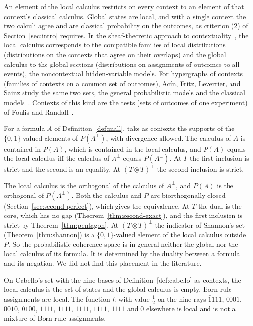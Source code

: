 \noindent
An element of the local calculus restricts on every context to an element
of that context's classical calculus. Global states are local, and with a
single context the two calculi agree and are classical probability on the
outcomes, as criterion (2) of Section~\ref{sec:intro}
requires. In the sheaf-theoretic approach to
contextuality~\cite{abramsky-brandenburger2011}, the local calculus
corresponds to the compatible families of local distributions
(distributions on the contexts that agree on their overlaps) and the
global calculus to the global sections (distributions on assignments of
outcomes to all events), the noncontextual hidden-variable models. For
hypergraphs of contexts (families of contexts on a common set of
outcomes), Ac\'in, Fritz, Leverrier, and Sainz
study the same two sets, the general probabilistic models and the
classical models~\cite{acin2015}. Contexts of this kind are
the tests (sets of outcomes of one experiment) of Foulis and
Randall~\cite{foulis-randall1972}.

\begin{theorem}
\label{thm:loc-linear}
For a formula $A$ of Definition~\ref{def:mall}, take as contexts the
supports of the $\{0,1\}$-valued elements of $P(A^{\perp})$, with
divergence allowed. The calculus of $A$ is contained in $P(A)$, which is
contained in the local calculus, and $P(A)$ equals the local calculus iff
the calculus of $A^{\perp}$ equals $P(A^{\perp})$. At $T$ the first
inclusion is strict and the second is an equality. At $(T \otimes
T)^{\perp}$ the second inclusion is strict.
\end{theorem}

\noindent
The local calculus is the orthogonal of the calculus of $A^{\perp}$, and
$P(A)$ is the orthogonal of $P(A^{\perp})$. Both the calculus and $P$ are
biorthogonally closed (Section~\ref{sec:second-perfect}), which gives the
equivalence. At $T$ the dual is the core, which has no gap
(Theorem~\ref{thm:second-exact}), and the first inclusion is strict by
Theorem~\ref{thm:pentagon}. At $(T \otimes T)^{\perp}$ the indicator of
Shannon's set (Theorem~\ref{thm:shannon}) is a $\{0,1\}$-valued element
of the local calculus outside $P$. So the probabilistic coherence space
is in general neither the global nor the local calculus of its formula.
It is determined by the duality between a formula and its negation. We
did not find this placement in the literature.

\begin{theorem}
\label{thm:loc-quantum}
On Cabello's set with the nine bases of Definition~\ref{def:cabello} as
contexts, the local calculus is the set of states and the global calculus
is empty. Born-rule assignments are local. The function $h$ with value
$\tfrac12$ on the nine rays $\bar{1}111$, $0001$, $0010$, $0100$,
$1\bar{1}\bar{1}1$, $1\bar{1}1\bar{1}$, $11\bar{1}1$, $111\bar{1}$,
$1111$ and $0$ elsewhere is local and is not a mixture of Born-rule
assignments.
\end{theorem}

